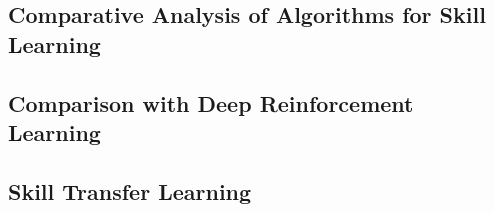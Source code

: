 \subsection{Comparative Analysis of Algorithms for Skill Learning}\label{ch:experiments:learning:algorithms}

\subsection{Comparison with Deep Reinforcement Learning}\label{ch:experiments:learning:comparison}

\subsection{Skill Transfer Learning}\label{ch:experiments:learning:transfer}

